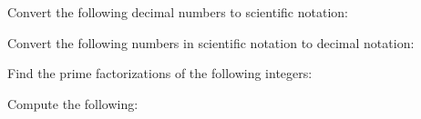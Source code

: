 \documentclass[12pt,letterpaper]{exam}
\begin{document}
\begin{questions}
\newpage



\question[4] Convert the following decimal numbers to scientific notation: \pspace
{} \vfill



\question[4] Convert the following numbers in scientific notation to decimal notation: \pspace
{}



\newpage



\question[6] Find the prime factorizations of the following integers: \pspace
{}



\question[8] Compute the following: \pspace
{}
\end{questions}
\end{document}
